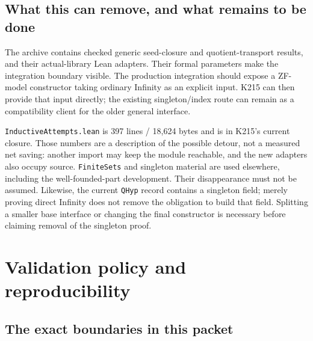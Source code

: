 \documentclass[11pt,letterpaper]{article}
\theoremstyle{definition}\newtheorem{definition}[theorem]{Definition}
\newcommand{\code}[1]{\texttt{#1}}
\begin{document}
\subsection{What this can remove, and what remains to be done}

The archive contains checked generic seed-closure and quotient-transport results,
and their actual-library Lean adapters. Their formal parameters make the
integration boundary visible. The production integration should expose a
ZF-model constructor taking ordinary Infinity as an
explicit input. K215 can then provide that input directly; the existing
singleton/index route can remain as a compatibility client for the older general
interface.

\code{InductiveAttempts.lean} is 397 lines / 18,624 bytes and is in K215's current
closure. Those numbers are a description of the possible detour, not a measured
net saving: another import may keep the module reachable, and the new adapters
also occupy source. \code{FiniteSets} and singleton material are used elsewhere,
including the well-founded-part development. Their disappearance must not be
assumed. Likewise, the current \code{QHyp} record contains a singleton field;
merely proving direct Infinity does not remove the obligation to build that field.
Splitting a smaller base interface or changing the final constructor is necessary
before claiming removal of the singleton proof.



\section{Validation policy and reproducibility}

\subsection{The exact boundaries in this packet}
\end{document}
